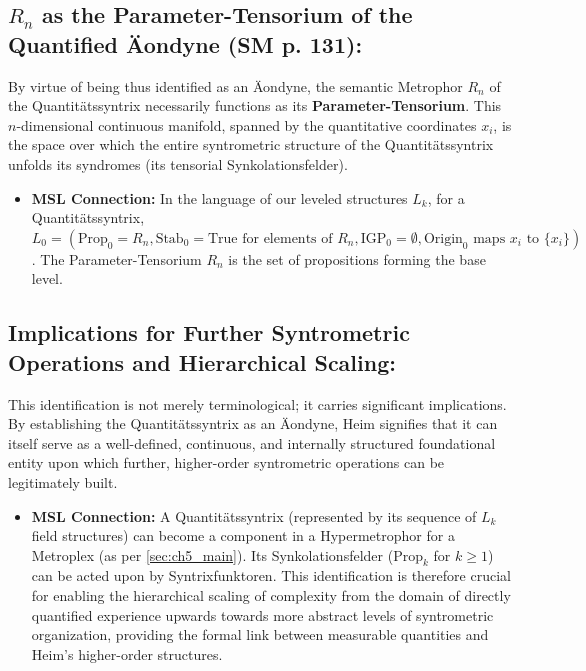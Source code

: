 \documentclass[
    12pt,              %
    a4paper,           %
    headings=normal,   %
    twoside=true,      %
    BCOR=8mm,          %
]{scrbook}
\newcommand{\semantischermetrophor}{R_n}
\newcommand{\Propk}[1]{\text{Prop}_{#1}}
\newcommand{\Stabk}[1]{\text{Stab}_{#1}}
\newcommand{\IGPk}[1]{\text{IGP}_{#1}}
\newcommand{\Origink}[1]{\text{Origin}_{#1}}
\begin{document}
\subsection{\(\semantischermetrophor\) as the Parameter-Tensorium of the Quantified Äondyne (SM p. 131):}
\label{sec:ch8_1_2_parameter_tensorium}
By virtue of being thus identified as an Äondyne, the semantic Metrophor \(\semantischermetrophor\) of the Quantitätssyntrix necessarily functions as its \textbf{Parameter-Tensorium}. This \(n\)-dimensional continuous manifold, spanned by the quantitative coordinates \(x_i\), is the space over which the entire syntrometric structure of the Quantitätssyntrix unfolds its syndromes (its tensorial Synkolationsfelder).
\begin{itemize}
    \item   \textbf{MSL Connection:} In the language of our leveled structures \(L_k\), for a Quantitätssyntrix, \(L_0 = (\Propk{0}=\semantischermetrophor, \Stabk{0}=\text{True for elements of } \semantischermetrophor, \IGPk{0}=\emptyset, \Origink{0} \text{ maps } x_i \text{ to } \{x_i\})\). The Parameter-Tensorium \(\semantischermetrophor\) is the set of propositions forming the base level.
\end{itemize}

\subsection{Implications for Further Syntrometric Operations and Hierarchical Scaling:}
\label{sec:ch8_1_3_implications}
This identification is not merely terminological; it carries significant implications. By establishing the Quantitätssyntrix as an Äondyne, Heim signifies that it can itself serve as a well-defined, continuous, and internally structured foundational entity upon which further, higher-order syntrometric operations can be legitimately built.
\begin{itemize}
    \item   \textbf{MSL Connection:} A Quantitätssyntrix (represented by its sequence of \(L_k\) field structures) can become a component in a Hypermetrophor for a Metroplex (as per \ref{sec:ch5_main}). Its Synkolationsfelder (\(\Propk{k}\) for \(k \ge 1\)) can be acted upon by Syntrixfunktoren. This identification is therefore crucial for enabling the hierarchical scaling of complexity from the domain of directly quantified experience upwards towards more abstract levels of syntrometric organization, providing the formal link between measurable quantities and Heim's higher-order structures.
\end{itemize}
\end{document}
